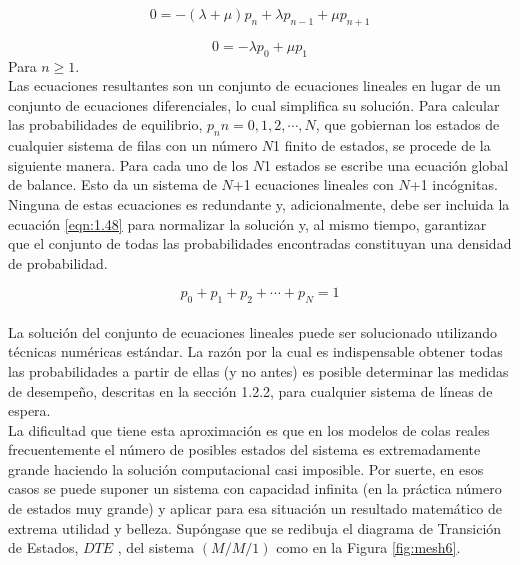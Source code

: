 \begin{equation}
    0 = - \left ( \lambda + \mu \right )p_{n}+ \lambda p_{n-1} + \mu p_{n+1}
    \label{eqn:1.46}
\end{equation}

\begin{equation}
    0 = - \lambda p_{0}+\mu p_{1}
    \label{eqn:1.47}
\end{equation}
Para $ n \geq 1 $.
\\

Las ecuaciones resultantes son un conjunto de ecuaciones lineales en lugar de un conjunto de ecuaciones diferenciales, lo cual simplifica su solución. Para calcular las probabilidades de equilibrio, $p_{n} n=0,1,2,\cdots,N$, que gobiernan los estados de cualquier sistema de filas con un número $N$1 finito de estados, se procede de la siguiente manera. Para cada uno de los $N$1 estados se escribe una ecuación global de balance. Esto da un sistema de $N$+1 ecuaciones lineales con $N$+1 incógnitas. Ninguna de estas ecuaciones es redundante y, adicionalmente, debe ser incluida la ecuación \ref{eqn:1.48} para normalizar la solución y, al mismo tiempo, garantizar que el conjunto de todas las probabilidades encontradas constituyan una densidad de probabilidad.

\begin{equation}
    p_{0}+p_{1}+p_{2}+ \cdots + p_{N}=1 
    \label{eqn:1.48}
\end{equation}
\\
La solución del conjunto de ecuaciones lineales puede ser solucionado utilizando técnicas numéricas estándar. La razón por la cual es indispensable obtener todas las probabilidades a partir de ellas (y no antes) es posible determinar las medidas de desempeño, descritas en la sección 1.2.2, para cualquier sistema de líneas de espera.
\\

La dificultad que tiene esta aproximación es que en los modelos de colas reales frecuentemente el número de posibles estados del sistema es extremadamente grande haciendo la solución computacional casi imposible. Por suerte, en esos casos se puede suponer un sistema con capacidad infinita (en la práctica número de estados muy grande) y aplicar para esa situación un resultado matemático de extrema utilidad y belleza. Supóngase que se redibuja el diagrama de Transición de Estados, $DTE$ , del sistema $ \left ( M/M/1 \right ) $ como en la Figura \ref{fig:mesh6}.


